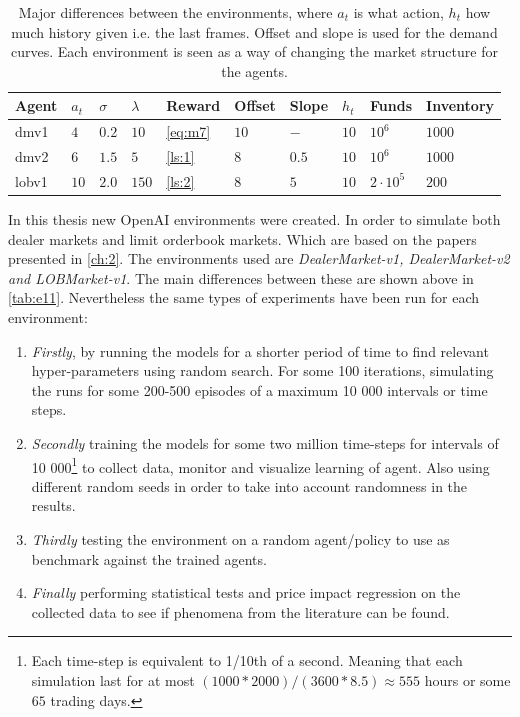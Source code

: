 \documentclass{kththesis}
\theoremstyle{definition}
\begin{document}
\begin{table}[H]
\centering
\caption{Major differences between the environments, where $a_t$ is what action, $h_t$ how much history given i.e. the last frames. Offset and slope is used for the demand curves. Each environment is seen as a way of changing the market structure for the agents.}
\label{tab:e11}
\begin{tabular}{llllllllll}
Agent & $a_t$  & $\sigma$  & $\lambda$  & Reward  & Offset  & Slope  & $h_t$  & Funds & Inventory  \\ \hline
 dmv1 & $4$  & $0.2$  & $10$  & \autoref{eq:m7}  & $10$  & $-$  &  $10$ & $10^6$ & $1000$ \\
 dmv2 & $6$  & $1.5$  & $5$  & \autoref{ls:1}  & $8$  & $0.5$  & $10$  & $10^6$ & $1000$ \\
 lobv1& $10$ & $2.0$  & $150$  & \autoref{ls:2} & $8$  & $5$  & $10$  & $2\cdot 10^5$ & $200$
\end{tabular}
\end{table} 

In this thesis new OpenAI environments were created. In order to simulate both dealer markets and limit orderbook markets. Which are based on the papers presented in \autoref{ch:2}. 
\newline
\newline
The environments used are \textit{ DealerMarket-v1, DealerMarket-v2 and LOBMarket-v1}. The main differences between these are shown above in \autoref{tab:e11}.
Nevertheless the same types of experiments have been run for each environment:

\begin{enumerate}
    \item \textit{Firstly}, by running the models for a shorter period of time to find relevant hyper-parameters using random search. For some 100 iterations, simulating the runs for some 200-500 episodes of a maximum 10 000 intervals or time steps.
    
    \item \textit{Secondly} training the models for some two million time-steps for intervals of 10 000\footnote{Each time-step is equivalent to 1/10th of a second. Meaning that each simulation last for at most $ (1000*2000)/(3600 * 8.5) \approx 555$ hours or some $65$ trading days.} to collect data, monitor and visualize learning of agent. Also using different random seeds in order to take into account randomness in the results. 
    
    \item\textit{Thirdly} testing the environment on a random agent/policy to use as benchmark against the trained agents.
    
    \item   \textit{Finally} performing statistical tests and price impact regression on the collected data to see if phenomena from the literature can be found.
\end{enumerate}
\end{document}
